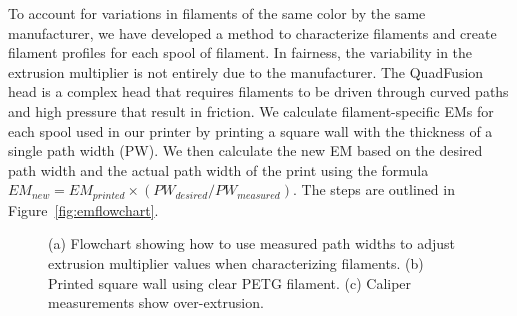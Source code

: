 To account for variations in filaments of the same color by the same manufacturer, we have developed a method to characterize filaments and create filament profiles for each spool of filament. In fairness, the variability in the extrusion multiplier is not entirely due to the manufacturer. The QuadFusion head is a complex head that requires filaments to be driven through curved paths and high pressure that result in friction. We calculate filament-specific EMs for each spool used in our printer by printing a square wall with the thickness of a single path width (PW). We then calculate the new EM based on the desired path width and the actual path width of the print using the formula $EM_{new} = EM_{printed} \times (PW_{desired}/PW_{measured})$. The steps are outlined in Figure~\ref{fig:emflowchart}.

\begin{figure}
	\begin{center}
	\end{center}
	\caption{(a) Flowchart showing how to use measured path widths to adjust extrusion multiplier values when characterizing filaments. (b) Printed square wall using clear PETG filament. (c) Caliper measurements show over-extrusion.} 
	\label{fig:em}
\end{figure} 

